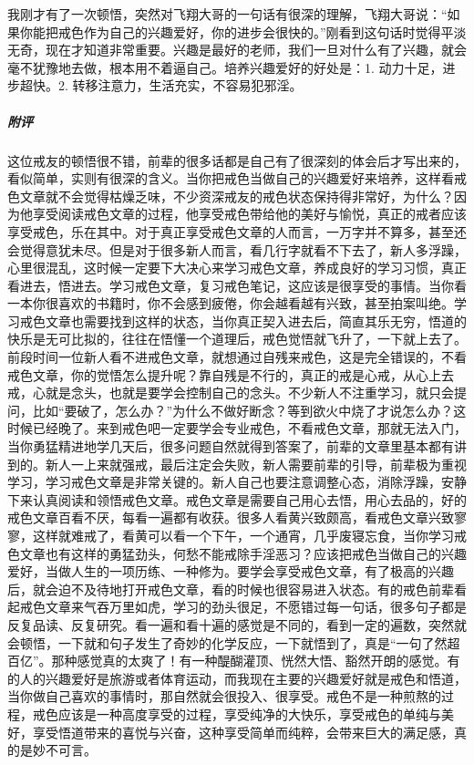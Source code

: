 \begin{case}
    我刚才有了一次顿悟，突然对飞翔大哥的一句话有很深的理解，飞翔大哥说：“如果你能把戒色作为自己的兴趣爱好，你的进步会很快的。”刚看到这句话时觉得平淡无奇，现在才知道非常重要。兴趣是最好的老师，我们一旦对什么有了兴趣，就会毫不犹豫地去做，根本用不着逼自己。培养兴趣爱好的好处是：1. 动力十足，进步超快。2. 转移注意力，生活充实，不容易犯邪淫。
    \subparagraph{附评} 这位戒友的顿悟很不错，前辈的很多话都是自己有了很深刻的体会后才写出来的，看似简单，实则有很深的含义。当你把戒色当做自己的兴趣爱好来培养，这样看戒色文章就不会觉得枯燥乏味，不少资深戒友的戒色状态保持得非常好，为什么？因为他享受阅读戒色文章的过程，他享受戒色带给他的美好与愉悦，真正的戒者应该享受戒色，乐在其中。对于真正享受戒色文章的人而言，一万字并不算多，甚至还会觉得意犹未尽。但是对于很多新人而言，看几行字就看不下去了，新人多浮躁，心里很混乱，这时候一定要下大决心来学习戒色文章，养成良好的学习习惯，真正看进去，悟进去。学习戒色文章，复习戒色笔记，这应该是很享受的事情。当你看一本你很喜欢的书籍时，你不会感到疲倦，你会越看越有兴致，甚至拍案叫绝。学习戒色文章也需要找到这样的状态，当你真正契入进去后，简直其乐无穷，悟道的快乐是无可比拟的，往往在悟懂一个道理后，戒色觉悟就飞升了，一下就上去了。前段时间一位新人看不进戒色文章，就想通过自残来戒色，这是完全错误的，不看戒色文章，你的觉悟怎么提升呢？靠自残是不行的，真正的戒是心戒，从心上去戒，心就是念头，也就是要学会控制自己的念头。不少新人不注重学习，就只会提问，比如“要破了，怎么办？”为什么不做好断念？等到欲火中烧了才说怎么办？这时候已经晚了。来到戒色吧一定要学会专业戒色，不看戒色文章，那就无法入门，当你勇猛精进地学几天后，很多问题自然就得到答案了，前辈的文章里基本都有讲到的。新人一上来就强戒，最后注定会失败，新人需要前辈的引导，前辈极为重视学习，学习戒色文章是非常关键的。新人自己也要注意调整心态，消除浮躁，安静下来认真阅读和领悟戒色文章。戒色文章是需要自己用心去悟，用心去品的，好的戒色文章百看不厌，每看一遍都有收获。很多人看黄兴致颇高，看戒色文章兴致寥寥，这样就难戒了，看黄可以看一个下午，一个通宵，几乎废寝忘食，当你学习戒色文章也有这样的勇猛劲头，何愁不能戒除手淫恶习？应该把戒色当做自己的兴趣爱好，当做人生的一项历练、一种修为。要学会享受戒色文章，有了极高的兴趣后，就会迫不及待地打开戒色文章，看的时候也很容易进入状态。有的戒色前辈看起戒色文章来气吞万里如虎，学习的劲头很足，不愿错过每一句话，很多句子都是反复品读、反复研究。看一遍和看十遍的感觉是不同的，看到一定的遍数，突然就会顿悟，一下就和句子发生了奇妙的化学反应，一下就悟到了，真是“一句了然超百亿”。那种感觉真的太爽了！有一种醍醐灌顶、恍然大悟、豁然开朗的感觉。有的人的兴趣爱好是旅游或者体育运动，而我现在主要的兴趣爱好就是戒色和悟道，当你做自己喜欢的事情时，那自然就会很投入、很享受。戒色不是一种煎熬的过程，戒色应该是一种高度享受的过程，享受纯净的大快乐，享受戒色的单纯与美好，享受悟道带来的喜悦与兴奋，这种享受简单而纯粹，会带来巨大的满足感，真的是妙不可言。
\end{case}

